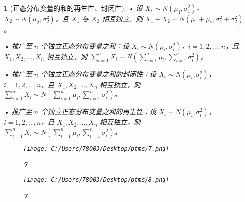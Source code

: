 \documentclass[UTF8]{report}
\theoremstyle{MyLineTheoremStyle} %
\theoremstyle{MyBlockTheoremStyle} %
\theoremstyle{MySubsubsectionStyle} %
\newtheorem{definition}{}
\begin{document}
\begin{definition}[正态分布变量的和的再生性、封闭性]
    • 设 $X_1 \sim N(\mu_1, \sigma_1^2)$，$X_2 \sim N(\mu_2, \sigma_2^2)$，且 $X_1$ 与 $X_2$ 相互独立，则 $X_1 + X_2 \sim N(\mu_1 + \mu_2, \sigma_1^2 + \sigma_2^2)$。\par
    • 推广至 $n$ 个独立正态分布变量之和：设 $X_i \sim N(\mu_i, \sigma_i^2)$，$i=1,2,\ldots,n$，且 $X_1, X_2, \ldots, X_n$ 相互独立，则 $\sum_{i=1}^{n} X_i \sim N(\sum_{i=1}^{n} \mu_i, \sum_{i=1}^{n} \sigma_i^2)$。\par
    • 推广至 $n$ 个独立正态分布变量之和的封闭性：设 $X_i \sim N(\mu_i, \sigma_i^2)$，$i=1,2,\ldots,n$，且 $X_1, X_2, \ldots, X_n$ 相互独立，则 $\sum_{i=1}^{n} X_i \sim N(\sum_{i=1}^{n} \mu_i, \sum_{i=1}^{n} \sigma_i^2)$。\par
    • 推广至 $n$ 个独立正态分布变量之和的再生性：设 $X_i \sim N(\mu_i, \sigma_i^2)$，$i=1,2,\ldots,n$，且 $X_1, X_2, \ldots, X_n$ 相互独立，则 $\sum_{i=1}^{n} X_i \sim N(\sum_{i=1}^{n} \mu_i, \sum_{i=1}^{n} \sigma_i^2)$。\par
    \begin{figure}[ht]
        \centering
        \texttt{[image: C:/Users/78003/Desktop/ptms/7.png]}
        \caption{\textbf{7}}
        \label{fig:7}
    \end{figure}
    \begin{figure}[ht]
        \centering
        \texttt{[image: C:/Users/78003/Desktop/ptms/8.png]}
        \caption{\textbf{7}}
        \label{fig:7}
    \end{figure}
\end{definition}
\newpage
\end{document}
